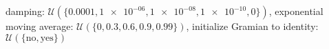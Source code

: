 damping: $\mathcal{U}(\{\num[scientific-notation=true]{0.0001},\num[scientific-notation=true]{1e-06},\num[scientific-notation=true]{1e-08},\num[scientific-notation=true]{1e-10},\num[scientific-notation=false]{0}\})$, exponential moving average: $\mathcal{U}(\{\num[scientific-notation=false]{0},\num[scientific-notation=true]{0.3},\num[scientific-notation=true]{0.6},\num[scientific-notation=true]{0.9},\num[scientific-notation=true]{0.99}\})$, initialize Gramian to identity: $\mathcal{U}(\{\text{no},\text{yes}\})$